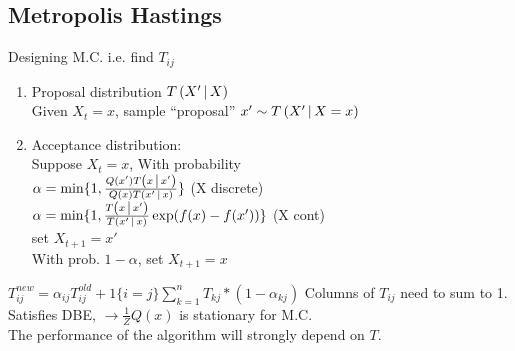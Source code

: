\subsection{Metropolis Hastings}
Designing M.C. i.e. find $T_{ij}$
\begin{enumerate}
  \item Proposal distribution $T\left( X' \,\middle|\, X \right)$\\
  Given $X_t=x$, sample ``proposal'' $x'\sim T\left( X' \,\middle|\, X=x \right)$
  \item Acceptance distribution:\\
    Suppose $X_t=x$, With probability\\
	$\alpha =
    \min\{1,\frac{Q(x')T\left( x \,\middle|\, x' \right)}{Q(x)T\left( x' \,\middle|\, x \right)}\}$ (X discrete)\\
	$\alpha =
    \min\{1,\frac{T\left( x \,\middle|\, x' \right)}{T\left( x' \,\middle|\, x \right)}\exp(f(x)-f(x'))\}$ (X cont)\\
    set $X_{t+1}=x'$\\
    With prob. $1-\alpha$, set $X_{t+1}=x$
\end{enumerate}
$T_{ij}^{new} = \alpha_{ij}T_{ij}^{old} + 1 \{i=j\} \sum_{k=1}^{n}T_{kj}*(1-\alpha_{kj})$
Columns of $T_{ij}$ need to sum to 1. \\
Satisfies DBE, $\rightarrow \frac{1}{Z} Q(x)$ is stationary for M.C. \\
The performance of the algorithm will strongly depend on $T$.\\

